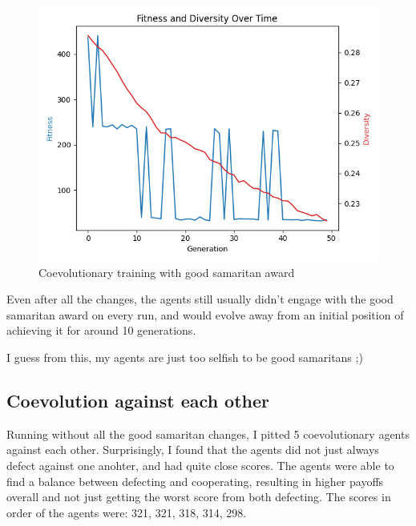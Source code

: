 \documentclass[11pt]{scrartcl} %
\begin{document}
\begin{figure}[H]
\begin{minipage}{0.45\textwidth}
    \end{minipage}
	\begin{minipage}{0.45\textwidth}
        \centering
        \includegraphics[width=\linewidth]{Figures/part_2/goodSamC3.png}
    \end{minipage}
	\label{fig:coev_good_samaritan_award}
	\caption{Coevolutionary training with good samaritan award}
\end{figure}

Even after all the changes, the agents still usually didn't engage with the good samaritan award on every run, and would evolve away from an initial position of achieving it for around 10 generations.

I guess from this, my agents are just too selfish to be good samaritans ;)

\subsection{Coevolution against each other}
Running without all the good samaritan changes, I pitted 5 coevolutionary agents against each other.
Surprisingly, I found that the agents did not just always defect against one anohter, and had quite close scores.
The agents were able to find a balance between defecting and cooperating, resulting in higher payoffs overall and not just getting the worst score from both defecting.
The scores in order of the agents were: 321, 321, 318, 314, 298.
\end{document}
